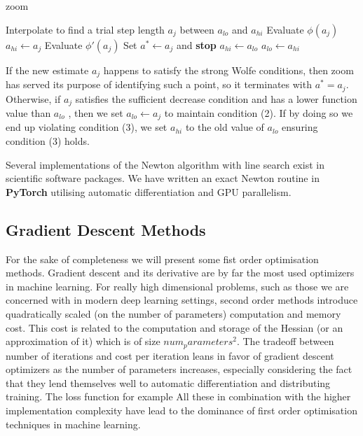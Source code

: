 \documentclass[11pt]{article}
\begin{document}
    \begin{algorithm}
        \caption{zoom}
        \label{alg:zoom}
        \begin{algorithmic}
            \Repeat
                \State Interpolate to find a trial step length $a_j$ between $a_{lo}$ and $a_{hi}$
                \State Evaluate $\phi(a_j)$
                \If {$\phi(a_j) > \phi(0) + c_1 a_j \phi'(0)$ or $\phi(a_j) \geq \phi(a_{lo}$]}
                    \State $a_{hi} \gets a_j$
                \Else
                    \State Evaluate $\phi'(a_j)$
                        \State Set $a^* \gets a_j$ and \textbf{stop}
                    \EndIf
                        \State $a_{hi} \gets a_{lo}$
                    \EndIf
                    \State $a_{lo} \gets a_{hi}$
                \EndIf
            \Until
        \end{algorithmic}
    \end{algorithm}

    If the new estimate $a_j$ happens to satisfy the strong Wolfe conditions, then zoom has served
    its purpose of identifying such a point, so it terminates with $a^* = a_j$.
    Otherwise, if $a_j$ satisfies the sufficient decrease condition and has a lower function value than $a_{lo}$ ,
    then we set $a_{lo} \gets a_j$ to maintain condition (2).
    If by doing so we end up violating condition (3), we set $a_{hi}$ to the old value of $a_{lo}$ ensuring condition
    (3) holds.

    Several implementations of the Newton algorithm with line search exist in scientific software packages.
    We have written an exact Newton routine in \textbf{PyTorch} utilising automatic differentiation and GPU parallelism.

    \subsection{Gradient Descent Methods}
    For the sake of completeness we will present some fist order optimisation methods.
    Gradient descent and its derivative are by far the most used optimizers in machine learning.
    For really high dimensional problems, such as those we are concerned with in modern deep learning settings, second
    order methods introduce quadratically scaled (on the number of parameters) computation and memory cost.
    This cost is related to the computation and storage of the Hessian (or an approximation of it) which is of size
    ${num_parameters}^2$.
    The tradeoff between number of iterations and cost per iteration leans in favor of gradient descent optimizers as
    the number of parameters increases, especially considering the fact that they lend themselves well to automatic
    differentiation and distributing training.
    The loss function for example
    All these in combination with the higher implementation complexity have lead to the dominance of first order
    optimisation techniques in machine learning.
\end{document}
